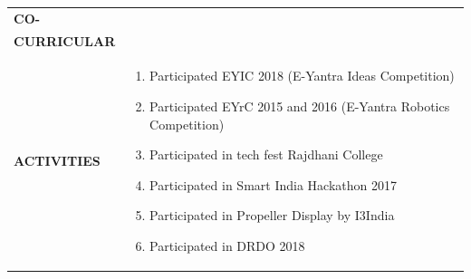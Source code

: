\documentclass{article}
\begin{document}
\begin{table}[h]
    \begin{tabular}{l  p{}} 
      \textbf{\Large{CO-}} \\  \textbf{\Large{CURRICULAR}}\\ \textbf{\Large{ACTIVITIES}}&
	\begin{enumerate}
	\item Participated EYIC 2018 (E-Yantra Ideas Competition)
	\item Participated EYrC 2015 and 2016 (E-Yantra Robotics Competition)
	\item Participated in tech fest Rajdhani College
	\item Participated in Smart India Hackathon 2017
	\item Participated in Propeller Display by I3India
	\item Participated in DRDO 2018
   	\end{enumerate} 
    \end{tabular}
\end{table}
\end{document}
